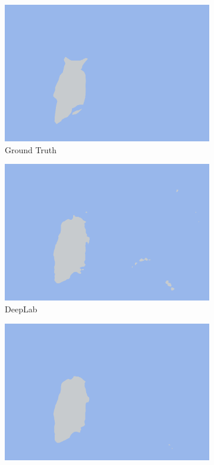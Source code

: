 \documentclass[a4paper,12pt]{ctexart}
\begin{document}
\begin{figure}[h]
    \begin{subfigure}{0.25\textwidth}
        \centering
        \includegraphics[width=\linewidth]{figures/COD10K_demo1/COD10K_demo1_gt.png}
        \caption{Ground Truth}
    \end{subfigure}%
    \hfill
    \begin{subfigure}{0.25\textwidth}
        \centering
        \includegraphics[width=\linewidth]{figures/COD10K_demo1/COD10K_demo1_pred_ssvm.png}
        \caption{DeepLab}
    \end{subfigure}%
    \hfill
    \begin{subfigure}{0.25\textwidth}
        \centering
        \includegraphics[width=\linewidth]{figures/COD10K_demo1/COD10K_demo1_pred_crf.png}

\end{subfigure}
\end{figure}
\end{document}
